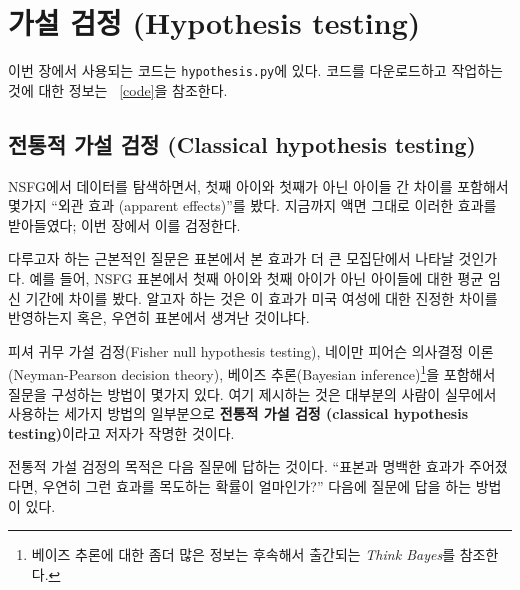 

\chapter{가설 검정 (Hypothesis testing)}
\label{testing}

이번 장에서 사용되는 코드는 {\tt hypothesis.py}에 있다.
코드를 다운로드하고 작업하는 것에 대한 정보는 ~\ref{code}을 참조한다.


\section{전통적 가설 검정 (Classical hypothesis testing)}

NSFG에서 데이터를 탐색하면서, 첫째 아이와 첫째가 아닌 아이들 간 차이를 
포함해서 몇가지 ``외관 효과 (apparent effects)''를 봤다.
지금까지 액면 그대로 이러한 효과를 받아들였다; 이번 장에서 이를 검정한다. 


다루고자 하는 근본적인 질문은 표본에서 본 효과가 더 큰 모집단에서 나타날 것인가다.
예를 들어, NSFG 표본에서 첫째 아이와 첫째 아이가 아닌 아이들에 대한 평균 임신 기간에
차이를 봤다. 알고자 하는 것은 이 효과가 미국 여성에 대한 진정한 차이를 반영하는지 
혹은, 우연히 표본에서 생겨난 것이냐다.

피셔 귀무 가설 검정(Fisher null hypothesis testing), 네이만 피어슨 의사결정 이론(Neyman-Pearson decision theory), 베이즈 추론(Bayesian inference)\footnote{베이즈 추론에 대한 좀더 많은 정보는 후속해서 출간되는 {\it Think Bayes}를 참조한다.}을 포함해서 질문을 구성하는 방법이 몇가지 있다.
여기 제시하는 것은 대부분의 사람이 실무에서 사용하는 세가지 방법의 일부분으로 {\bf 전통적 가설 검정 (classical hypothesis testing)}이라고 저자가 작명한 것이다.

전통적 가설 검정의 목적은 다음 질문에 답하는 것이다.
``표본과 명백한 효과가 주어졌다면, 우연히 그런 효과를 목도하는 확률이 얼마인가?''
다음에 질문에 답을 하는 방법이 있다.

